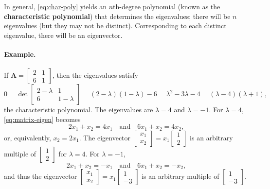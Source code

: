 In general, \eqref{eq:char-poly} yields an $n$th-degree polynomial (known as the \textbf{characteristic polynomial}) that determines the eigenvalues; there will be $n$ eigenvalues (but they may not be distinct).  Corresponding to each distinct eigenvalue, there will be an eigenvector.

\paragraph{Example.}
If $\bm{A} = \begin{bmatrix} 2 & 1 \\ 6 & 1 \end{bmatrix}$, then the eigenvalues satisfy
\[
0 = \det\begin{bmatrix} 2-\lambda & 1 \\ 6 & 1-\lambda \end{bmatrix} = (2-\lambda)(1-\lambda) - 6 = \lambda^2 - 3\lambda - 4 = (\lambda - 4)(\lambda + 1),
\]
the characteristic polynomial.  The eigenvalues are $\lambda = 4$ and $\lambda = -1$.  For $\lambda = 4$, \eqref{eq:matrix-eigen} becomes
\[
2x_1 + x_2 = 4x_1 \quad \text{and} \quad 6x_1 + x_2 = 4x_2,
\]
or, equivalently, $x_2 = 2x_1$.  The eigenvector $\begin{bmatrix} x_1 \\ x_2 \end{bmatrix} = x_1\begin{bmatrix} 1 \\ 2 \end{bmatrix}$ is an arbitrary multiple of $\begin{bmatrix} 1 \\ 2 \end{bmatrix}$ for $\lambda = 4$.  For $\lambda = -1$,
\[
2x_1 + x_2 = -x_1 \quad \text{and} \quad 6x_1 + x_2 = -x_2,
\]
and thus the eigenvector $\begin{bmatrix} x_1 \\ x_2 \end{bmatrix} = x_1\begin{bmatrix} 1 \\ -3 \end{bmatrix}$ is an arbitrary multiple of $\begin{bmatrix} 1 \\ -3 \end{bmatrix}$.

